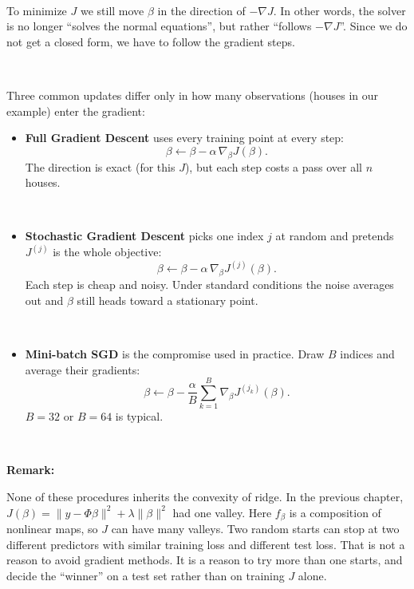 \documentclass[
]{book}
\providecommand{\tightlist}{%
  \setlength{\itemsep}{0pt}\setlength{\parskip}{0pt}}
\begin{document}
~

To minimize \(J\) we still move \(\beta\) in the direction of \(-\nabla J\). In other words, the solver is no longer ``solves the normal equations'', but rather ``follows \(-\nabla J\)''. Since we do not get a closed form, we have to follow the gradient steps.

~

Three common updates differ only in how many observations (houses in our example) enter the gradient:

\begin{itemize}
\tightlist
\item
  \textbf{Full Gradient Descent} uses every training point at every step:
  \[\beta\leftarrow\beta-\alpha\,\nabla_\beta J(\beta).\]
  The direction is exact (for this \(J\)), but each step costs a pass over all \(n\) houses.
\end{itemize}

~

\begin{itemize}
\tightlist
\item
  \textbf{Stochastic Gradient Descent} picks one index \(j\) at random and pretends \(J^{(j)}\) is the whole objective:
  \[\beta\leftarrow\beta-\alpha\,\nabla_\beta J^{(j)}(\beta).\]
  Each step is cheap and noisy. Under standard conditions the noise averages out and \(\beta\) still heads toward a stationary point.
\end{itemize}

~

\begin{itemize}
\tightlist
\item
  \textbf{Mini-batch SGD} is the compromise used in practice. Draw \(B\) indices and average their gradients:
  \[\beta\leftarrow\beta-\frac{\alpha}{B}\sum_{k=1}^B\nabla_\beta J^{(j_k)}(\beta).\]
  \(B=32\) or \(B=64\) is typical.
\end{itemize}

~

\textbf{Remark:}

None of these procedures inherits the convexity of ridge. In the previous chapter, \(J(\beta)=\|y-\Phi\beta\|^2+\lambda\|\beta\|^2\) had one valley. Here \(f_\beta\) is a composition of nonlinear maps, so \(J\) can have many valleys. Two random starts can stop at two different predictors with similar training loss and different test loss. That is not a reason to avoid gradient methods. It is a reason to try more than one starts, and decide the ``winner'' on a test set rather than on training \(J\) alone.
\end{document}
